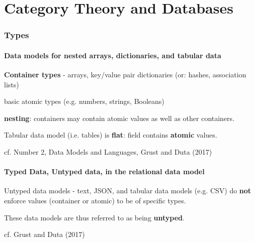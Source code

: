 \part{Category Theory and Databases}
 
	
\section{Types}

\subsection{Data models for nested arrays, dictionaries, and tabular data}

\begin{definition}
	\textbf{Container types} - arrays, key/value pair dictionaries (or: hashes, association lists)
\end{definition}

\begin{definition}
	basic atomic types (e.g. numbers, strings, Booleans)
\end{definition}

\begin{definition}[nesting]
	\textbf{nesting}: containers may contain atomic values as well as other containers.
\end{definition}

\begin{definition}[flat]
	Tabular data model (i.e. tables) is \textbf{flat}: field contains \textbf{atomic} values.
\end{definition}
cf. Number 2, Data Models and Languages, Grust and Duta (2017) \cite{agat:GrDu2017}


\subsection{Typed Data, Untyped data, in the relational data model}

\begin{definition}
	Untyped data models - text, JSON, and tabular data models (e.g. CSV) do \textbf{not} enforce values (container or atomic) to be of specific types. 
	
	These data models are thus referred to as being \textbf{untyped}.
\end{definition}
cf. Grust and Duta (2017) \cite{agat:GrDu2017}


